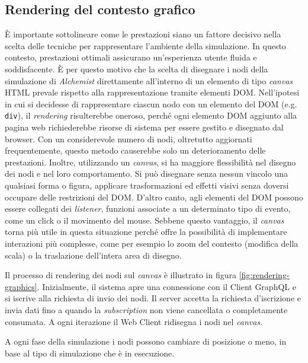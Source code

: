 \subsection{Rendering del contesto grafico}
È importante sottolineare come le prestazioni siano un fattore decisivo nella scelta delle tecniche per rappresentare l'ambiente della simulazione.
In questo contesto, prestazioni ottimali assicurano un'esperienza utente fluida e soddisfacente. È per questo motivo che la scelta di disegnare i nodi della simulazione di \textit{Alchemist} direttamente all'interno di un elemento di tipo \textit{canvas } HTML prevale rispetto alla rappresentazione tramite elementi \ac{DOM}. Nell'ipotesi in cui si decidesse di rappresentare ciascun nodo con un elemento del DOM (e.g. \texttt{div}), il \textit{rendering} risulterebbe oneroso, perché ogni elemento \ac{DOM} aggiunto alla pagina web richiederebbe risorse di sistema per essere gestito e disegnato dal browser. Con un considerevole numero di nodi, oltretutto aggiornati frequentemente, questo metodo causerebbe solo un deterioramento delle prestazioni. Inoltre, utilizzando un \textit{canvas}, si ha maggiore flessibilità nel disegno dei nodi e nel loro comportamento. Si può disegnare senza nessun vincolo una qualsiasi forma o figura, applicare trasformazioni ed effetti visivi senza doversi occupare delle restrizioni del \ac{DOM}. D'altro canto, agli elementi del \ac{DOM} possono essere collegati dei \textit{listener}, funzioni associate a un determinato tipo di evento, come un click o il movimento del mouse. Sebbene questo vantaggio, il \textit{canvas} torna più utile in questa situazione perché offre la possibilità di implementare interazioni più complesse, come per esempio lo zoom del contesto (modifica della scala) o la traslazione dell'intera area di disegno.

Il processo di rendering dei nodi sul \textit{canvas} è illustrato in figura \cref{fig:rendering-graphics}. Inizialmente, il sistema apre una connessione con il Client GraphQL e si iscrive alla richiesta di invio dei nodi. Il server accetta la richiesta d'iscrizione e invia dati fino a quando la \textit{subscription} non viene cancellata o completamente consumata. A ogni iterazione il Web Client ridisegna i nodi nel \textit{canvas}.

A ogni fase della simulazione i nodi possono cambiare di posizione o meno, in base al tipo di simulazione che è in esecuzione. 

